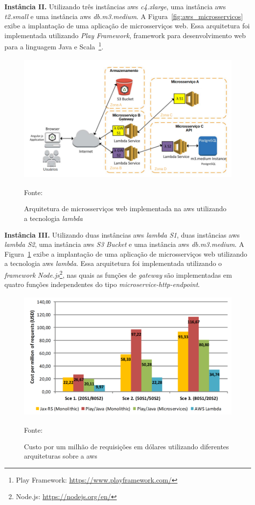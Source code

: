 \textbf{Instância II.} Utilizando três instâncias \ac{aws} \textit{c4.xlarge}, uma instância \ac{aws} \textit{t2.small} e uma instância \ac{aws} \textit{db.m3.medium}.
%
A Figura~\ref{fig:aws_microsservicos} exibe a implantação de uma aplicação de microsserviços web. Essa arquitetura foi implementada utilizando \textit{Play Framework}, framework para desenvolvimento web para a linguagem Java e Scala~\footnote{Play Framework: \url{https://www.playframework.com/}}.



\begin{figure}[htb!]
\caption{Arquitetura de microsserviços web implementada na \ac{aws} utilizando a tecnologia \textit{lambda}}
\label{fig:aws_lambda}
\includegraphics[height=6.5cm]{img/cap2/aws_lambda.png}
\centering

Fonte:~\cite{7515686}
\end{figure}

\textbf{Instância III.} Utilizando duas instâncias \ac{aws} \textit{lambda S1}, duas instâncias \ac{aws} \textit{lambda S2}, uma instância \ac{aws} \textit{S3 Bucket} e uma instância \ac{aws} \textit{db.m3.medium}.
%
A Figura~\ref{fig:aws_lambda} exibe a implantação de uma aplicação de microsserviços web utilizando a tecnologia \ac{aws} \textit{lambda}. Essa arquitetura foi implementada utilizando o \textit{framework} \textit{Node.js}\footnote{Node.js: \url{https://nodejs.org/en/}}, nas quais as funções de \textit{gateway} são implementadas em quatro funções independentes do tipo \textit{microservice-http-endpoint}.



\begin{figure}[htb!]
\caption{Custo por um milhão de requisições em dólares utilizando diferentes arquiteturas sobre a \ac{aws}}
\label{fig:custo_aws}
\includegraphics[height=6.5cm]{img/cap2/custo_aws.png}
\centering

Fonte:~\cite{7515686}
\end{figure}



